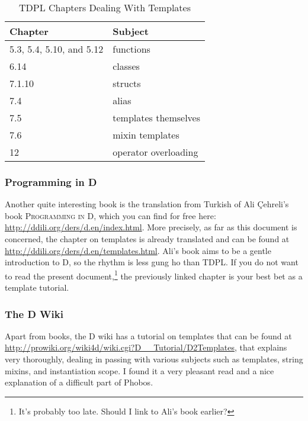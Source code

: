 \begin{table}[htb]
\centering
\begin{tabular}[c]{|l|l|}
\hline
Chapter                  & Subject         \\ \hline \hline
5.3, 5.4, 5.10, and 5.12 & functions \\ \hline
6.14                     & classes \\ \hline
7.1.10                   & structs \\ \hline
7.4                      & alias \\ \hline
7.5                      & templates themselves \\ \hline
7.6                      & mixin templates \\ \hline
12                       & operator overloading  \\ \hline
\end{tabular}
\caption{TDPL Chapters Dealing With Templates}
\label{table:tdplchapters}
\end{table}

\subsubsection{Programming in D}
\label{programmingind}

Another quite interesting book is the translation from Turkish of Ali \c{C}ehreli's book \textsc{Programming in D}, which you can find for free here: \url{http://ddili.org/ders/d.en/index.html}. More precisely, as far as this document is concerned, the chapter on templates is already translated and can be found at \url{http://ddili.org/ders/d.en/templates.html}. Ali's book aims to be a gentle introduction to D, so the rhythm is less gung ho than TDPL. If you do not want to read the present document,\footnote{ It's probably too late. Should I link to Ali's book earlier?} the previously linked chapter is your best bet as a template tutorial.

\subsubsection{The D Wiki}
\label{dwiki}

Apart from books, the D wiki has a tutorial on templates that can be found at \url{http://prowiki.org/wiki4d/wiki.cgi?D__Tutorial/D2Templates}, that explains  very thoroughly, dealing in passing with various subjects such as templates, string mixins, and instantiation scope. I found it a very pleasant read and a nice explanation of a difficult part of Phobos.

